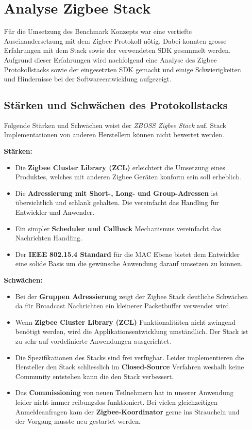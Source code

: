 \clearpage
\section{Analyse Zigbee Stack}\label{sec:AnalyseZigbeeStack}
Für die Umsetzung des Benchmark Konzepts war eine vertiefte Auseinandersetzung mit dem Zigbee Protokoll nötig.
Dabei konnten grosse Erfahrungen mit dem Stack sowie der verwendeten SDK gesammelt werden.
Aufgrund dieser Erfahrungen wird nachfolgend eine Analyse des Zigbee Protokollstacks sowie der eingesetzten SDK gemacht und einige Schwierigkeiten und Hindernisse bei der Softwareentwicklung aufgezeigt.

\subsection{Stärken und Schwächen des Protokollstacks}\label{subsec:ZigbeeStärkenundSchwächendesProtokollstacks}
Folgende Stärken und Schwächen weist der \textit{ZBOSS Zigbee Stack} auf.
Stack Implementationen von anderen Herstellern können nicht bewertet werden.

\textbf{Stärken:}
\begin{itemize}
\item Die \textbf{Zigbee Cluster Library (ZCL)} erleichtert die Umsetzung eines Produktes, welches mit anderen Zigbee Geräten konform sein soll erheblich.
\item Die \textbf{Adressierung mit Short-, Long- und Group-Adressen} ist übersichtlich und schlank gehalten.
Die vereinfacht das Handling für Entwickler und Anwender.
\item Ein simpler \textbf{Scheduler und Callback} Mechanismus vereinfacht das Nachrichten Handling.
\item Der \textbf{IEEE 802.15.4 Standard} für die MAC Ebene bietet dem Entwickler eine solide Basis um die gewünsche Anwendung darauf umsetzen zu können.
\end{itemize}

\textbf{Schwächen:}
\begin{itemize}
\item Bei der \textbf{Gruppen Adressierung} zeigt der Zigbee Stack deutliche Schwächen da für Broadcast Nachrichten ein kleinerer Packetbuffer verwendet wird.
\item Wenn \textbf{Zigbee Cluster Library (ZCL)} Funktionalitäten nicht zwingend benötigt werden, wird die Applikationsentwicklung umständlich.
Der Stack ist zu sehr auf vordefinierte Anwendungen ausgerichtet.
\item Die Spezifikationen des Stacks sind frei verfügbar. Leider implementieren die Hersteller den Stack schliesslich im \textbf{Closed-Source} Verfahren weshalb keine Community entstehen kann die den Stack verbessert.
\item Das \textbf{Commissioning} von neuen Teilnehmern hat in unserer Anwendung leider nicht immer reibungslos funktioniert.
Bei vielen gleichzeitigen Anmeldeanfragen kam der \textbf{Zigbee-Koordinator} gerne ins Straucheln und der Vorgang musste neu gestartet werden.
\end{itemize}


